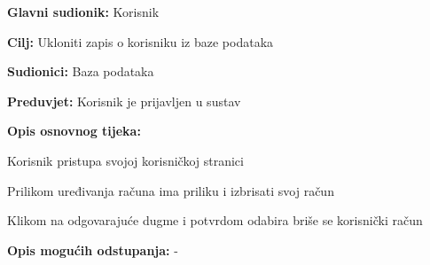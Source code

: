 					\noindent {}
					\begin{packed_item}
	
						\item \textbf{Glavni sudionik: }Korisnik
						\item  \textbf{Cilj: }Ukloniti zapis o korisniku iz baze podataka
						\item  \textbf{Sudionici: }Baza podataka
						\item  \textbf{Preduvjet: }Korisnik je prijavljen u sustav
						\item  \textbf{Opis osnovnog tijeka:}
						
						\item[] \begin{packed_enum}
							\item Korisnik pristupa svojoj korisničkoj stranici
							\item Prilikom uređivanja računa ima priliku i izbrisati svoj račun
							\item Klikom na odgovarajuće dugme i potvrdom odabira briše se korisnički račun
						\end{packed_enum}
						
						\item  \textbf{Opis mogućih odstupanja: }-
					\end{packed_item}
					
